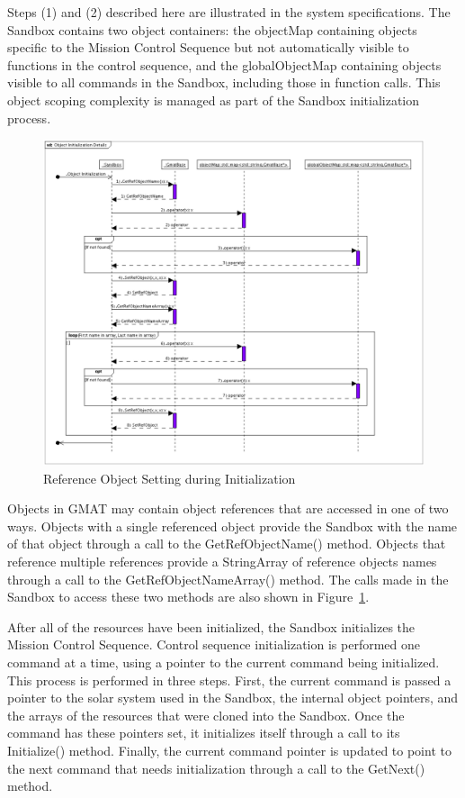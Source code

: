 Steps (1) and (2) described here are illustrated in the system specifications\cite{archSpec}.  The Sandbox contains two object containers: the objectMap containing objects specific to the Mission Control Sequence but not automatically visible to functions in the control sequence, and the globalObjectMap containing objects visible to all commands in the Sandbox, including those in function calls.  This object scoping complexity is managed as part of the Sandbox initialization process.

\begin{figure}[htbp]
\begin{center}
\includegraphics[scale=0.45]{Images/ObjectInitializationDetails.eps}
\caption{\label{fig:ObjectInitializationDetails}Reference Object Setting during Initialization}
\end{center}
\end{figure}

Objects in GMAT may contain object references that are accessed in one of two ways.  Objects with a single referenced object provide the Sandbox with the name of that object through a call to the GetRefObjectName() method.  Objects that reference multiple references provide a StringArray of reference objects names through a call to the GetRefObjectNameArray() method.  The calls made in the Sandbox to access these two methods are also shown in Figure~\ref{fig:ObjectInitializationDetails}.

After all of the resources have been initialized, the Sandbox initializes the Mission Control Sequence.  Control sequence initialization is performed one command at a time, using a pointer to the current command being initialized.  This process is performed in three steps.  First, the current command is passed a pointer to the solar system used in the Sandbox, the internal object pointers, and the arrays of the resources that were cloned into the Sandbox.  Once the command has these pointers set, it initializes itself through a call to its Initialize() method.  Finally, the current command pointer is updated to point to the next command that needs initialization through a call to the GetNext() method.

